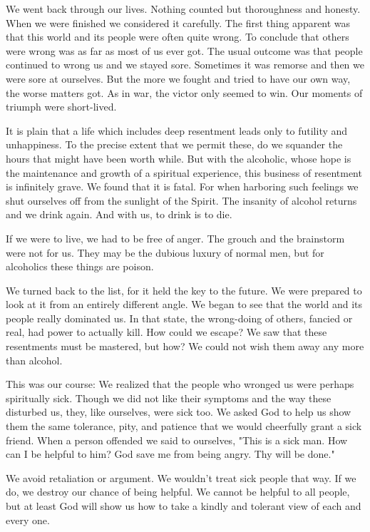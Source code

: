 \begin{biblechapter}
We went back through our lives.  Nothing counted but thoroughness and honesty.  When we were finished we considered it carefully.  The first thing apparent was that this world and its people were often quite wrong.  To conclude that others were wrong was as far as most of us ever got.  The usual outcome was that people continued to wrong us and we stayed sore.  Sometimes it was remorse and then we were sore at ourselves.  But the more we fought and tried to have our own way, the worse matters got.  As in war, the victor only seemed to win.  Our moments of triumph were short-lived.

It is plain that a life which includes deep resentment leads only to futility and unhappiness.  To the precise extent that we permit these, do we squander the hours that might have been worth while.  But with the alcoholic, whose hope is the maintenance and growth of a spiritual experience, this business of resentment is infinitely grave.  We found that it is fatal.  For when harboring such feelings we shut ourselves off from the sunlight of the Spirit.  The insanity of alcohol returns and we drink again.  And with us, to drink is to die.

If we were to live, we had to be free of anger.  The grouch and the brainstorm were not for us.  They may be the dubious luxury of normal men, but for alcoholics these things are poison.

We turned back to the list, for it held the key to the future.  We were prepared to look at it from an entirely different angle.  We began to see that the world and its people really dominated us.  In that state, the wrong-doing of others, fancied or real, had power to actually kill.  How could we escape?  We saw that these resentments must be mastered, but how?  We could not wish them away any more than alcohol.

This was our course:  We realized that the people who wronged us were perhaps spiritually sick. Though we did not like their symptoms and the way these disturbed us, they, like ourselves, were sick too.  We asked God to help us show them the same tolerance, pity, and patience that we would cheerfully grant a sick friend.  When a person offended we said to ourselves, "This is a sick man.  How can I be helpful to him?  God save me from being angry.  Thy will be done."

We avoid retaliation or argument.  We wouldn't treat sick people that way.  If we do, we destroy our chance of being helpful.  We cannot be helpful to all people, but at least God will show us how to take a kindly and tolerant view of each and every one.


\end{biblechapter}
